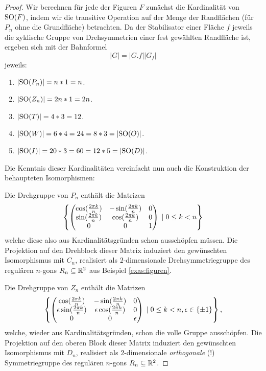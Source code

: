 \documentclass{book}
\begin{document}
\begin{proof}
    Wir berechnen für jede der Figuren $F$ zunächst die Kardinalität von
    ${\operatorname{SO}}(F)$, indem wir die transitive Operation auf der Menge der
    Randflächen (für $P_n$ ohne die Grundfläche) betrachten. Da der
    Stabilisator einer Fläche $f$ jeweils die zyklische Gruppe von
    Drehsymmetrien einer fest gewählten Randfläche ist, ergeben sich mit der
    Bahnformel
    \[
        |G| = |G.f| |G_f|
    \] jeweils: 
    \begin{enumerate}
        \item $|{\operatorname{SO}}(P_n)| = n * 1 = n$.
        \item $|{\operatorname{SO}}(Z_n)| = 2n * 1 = 2n$. 
        \item $|{\operatorname{SO}}(T)| = 4 * 3 = 12$.
        \item $|{\operatorname{SO}}(W)| = 6 * 4 = 24 = 8 * 3 = |{\operatorname{SO}}(O)|$.
        \item $|{\operatorname{SO}}(I)| = 20 * 3 = 60 = 12 * 5 = |{\operatorname{SO}}(D)|$.
    \end{enumerate}

    Die Kenntnis dieser Kardinalitäten vereinfacht nun auch die Konstruktion
    der behaupteten Isomorphismen: 

    Die Drehgruppe von $P_n$ enthält die Matrizen
    \[
        \left\{ \begin{pmatrix}  \cos(\frac{2 \pi k}{n} ) & -\sin(\frac{2 \pi k}{n}) & 0\\
         \sin(\frac{2 \pi k}{n}) & \cos(\frac{2 \pi k}{n}) & 0\\
            0 & 0 & 1  \end{pmatrix} \; | \; 0 \le k < n \right\}
    \]
    welche diese also aus Kardinalitätsgründen schon ausschöpfen müssen. Die
    Projektion auf den Drehblock dieser Matrix induziert den gewünschten
    Isomorphismus mit $C_n$, realisiert als $2$-dimensionale Drehsymmetriegruppe
    des regulären $n$-gons $R_n \subseteq \mathbb{R}^2$ aus Beispiel \ref{exas:figuren}.

    Die Drehgruppe von $Z_n$ enthält die Matrizen
    \[
        \left\{ \begin{pmatrix}  \cos(\frac{2 \pi k}{n} ) & -\sin(\frac{2 \pi k}{n}) & 0\\
         \epsilon \sin(\frac{2 \pi k}{n}) & \epsilon \cos(\frac{2 \pi k}{n}) & 0\\
            0 & 0 & \epsilon  \end{pmatrix} \; | \; 0 \le k < n, \epsilon \in \{\pm 1\} \right\},
    \]
    welche, wieder aus Kardinalitätsgründen, schon die volle Gruppe ausschöpfen. Die 
    Projektion auf den oberen Block dieser Matrix induziert den gewünschten
    Isomorphismus mit $D_n$, realisiert als $2$-dimensionale {\em orthogonale}
    (!) Symmetriegruppe des regulären $n$-gons $R_n \subseteq \mathbb{R}^2$.


\end{proof}
\end{document}
